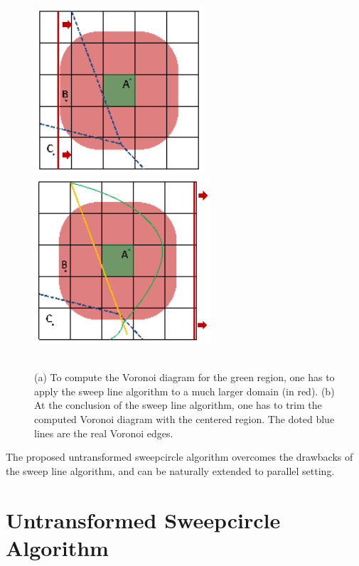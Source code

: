 \begin{figure}[htbp]
\centering
\includegraphics[height=2.45in]{figs/sweepcircle/sweeplineDrawback1.png}
\includegraphics[height=2.45in]{figs/sweepcircle/sweeplineDrawback2.png}\\
\\
\caption{(a) To compute the Voronoi diagram for the
green region, one has to apply the sweep line algorithm to a much
larger domain (in red). (b) At the conclusion of the sweep line
algorithm, one has to trim the computed Voronoi diagram with the
centered region. The doted blue lines are the real Voronoi
edges.}\label{fig:sweeplineDrawback}
\end{figure}

The proposed untransformed sweepcircle algorithm overcomes the drawbacks of the
sweep line algorithm, and can be naturally extended to parallel
setting.

\vspace{-0.1in}
\section{Untransformed Sweepcircle Algorithm}\label{sec:sweepcircle-algorithm}
\vspace{-0.1in}

